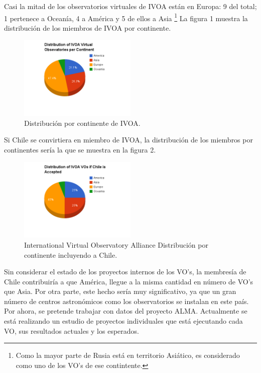 Casi la mitad de los observatorios virtuales de IVOA están en Europa: 9 del
total; 1 pertenece a Oceanía, 4 a América y 5 de ellos a Asia \footnote{Como la
mayor parte de Rusia está en territorio Asiático, es considerado como uno de
los VO's de ese contintente.} La figura 1 muestra la distribución de los
miembros de IVOA por continente.
	\begin{figure}[h!t]
		\begin{center}
			\includegraphics[width=0.5\textwidth]{img/ivoa_vos_distribution.png}
			\caption{Distribución por continente de IVOA.}
		\end{center}
	\end{figure}

Si Chile se convirtiera en miembro de IVOA, la distribución de los miembros
por continentes sería la que se muestra en la figura 2.
	\begin{figure}[h!t]
		\begin{center}
			\includegraphics[width=0.5\textwidth]{img/if_chile_is_accepted.png}
			\caption{International Virtual Observatory Alliance Distribución por continente incluyendo a Chile.}
		\end{center}
	\end{figure}

Sin considerar el estado de los proyectos internos de los VO's, 
la membresía de Chile contribuiría a que América, llegue a la misma
cantidad en número de VO's que Asia. Por otra parte, este
hecho sería muy significativo, ya que un gran número de centros astronómicos
como los observatorios se instalan en este país. Por ahora, se pretende
trabajar con datos del proyecto ALMA. Actualmente se está realizando
un estudio de proyectos individuales que está ejecutando cada VO, sus resultados actuales
y los esperados.
